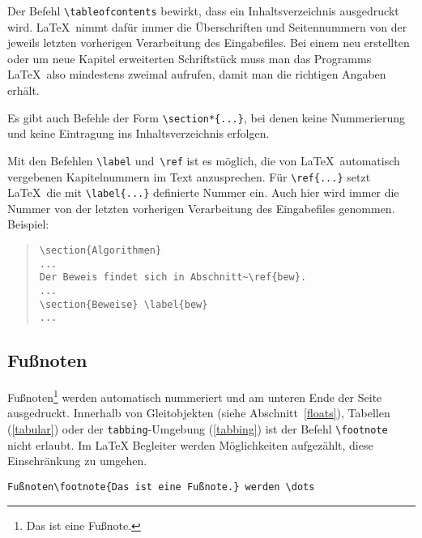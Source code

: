  
Der Befehl \lstinline|\tableofcontents| bewirkt, dass ein
Inhaltsverzeichnis ausgedruckt wird.
\LaTeX\ nimmt dafür immer die Überschriften und Seitennummern
von der jeweils letzten vorherigen Verarbeitung des Eingabefiles.
Bei einem neu erstellten oder um neue Kapitel erweiterten
Schriftstück muss man das Programms \LaTeX\ also mindestens
zweimal aufrufen, damit man die richtigen Angaben erhält.
 
Es gibt auch Befehle der Form \lstinline|\section*{...}|, bei denen
keine Nummerierung und keine Eintragung ins Inhaltsverzeichnis
erfolgen.

Mit den Befehlen \lstinline|\label| und~\lstinline|\ref| ist es möglich,
die von \LaTeX\ automatisch vergebenen Kapitelnummern im Text
anzusprechen.
Für \lstinline|\ref{...}| setzt \LaTeX\ die
mit \lstinline|\label{...}| definierte Nummer ein.
Auch hier wird immer die Nummer von der letzten vorherigen
Verarbeitung des Eingabefiles genommen.
Beispiel:
\begin{quote}
\begin{verbatim}
\section{Algorithmen}
...
Der Beweis findet sich in Abschnitt~\ref{bew}.
...
\section{Beweise} \label{bew}
...
\end{verbatim}
\end{quote}
 
 
\subsection{Fußnoten}
 
Fußnoten\footnote{Das  ist eine Fußnote.} werden automatisch nummeriert und am
unteren Ende der Seite ausgedruckt.   Innerhalb von Gleitobjekten (siehe
Abschnitt~\ref{floats}),  Tabellen (\ref{tabular}) oder der
\texttt{tabbing}-Umgebung (\ref{tabbing}) ist der Befehl \lstinline|\footnote|
nicht erlaubt. Im \LaTeX{} Begleiter\cite{wonne} werden Möglichkeiten aufgezählt, diese
Einschränkung zu umgehen.

\begin{beispiel}
\begin{lstlisting}
Fußnoten\footnote{Das ist eine Fußnote.} werden \dots
\end{lstlisting}	
\end{beispiel}

